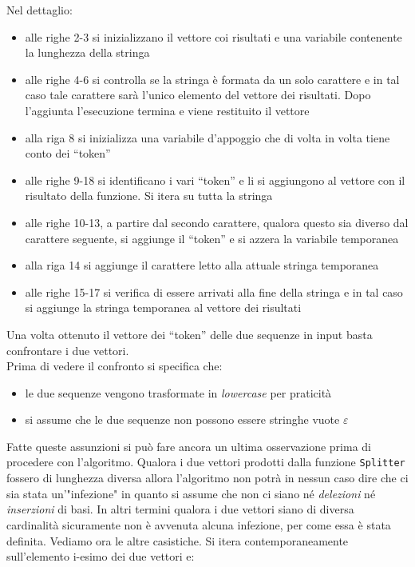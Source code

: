 \documentclass[a4paper,12pt, oneside]{book}
\begin{document}
\noindent
Nel dettaglio:
\begin{itemize}
  \item alle righe 2-3 si inizializzano il vettore coi risultati e una variabile
  contenente la lunghezza della stringa
  \item alle righe 4-6 si controlla se la stringa è formata da un solo
  carattere e in tal caso tale carattere sarà l'unico elemento del vettore dei
  risultati. Dopo l'aggiunta l'esecuzione termina e viene restituito il vettore
  \item alla riga 8 si inizializza una variabile d'appoggio che di volta in
  volta tiene conto dei ``token''
  \item alle righe 9-18 si identificano i vari ``token'' e li si aggiungono al
  vettore con il risultato della funzione. Si itera su tutta la
  stringa 
  \item alle righe 10-13, a partire dal secondo carattere, qualora questo
  sia diverso dal carattere seguente, si aggiunge il ``token'' e si azzera la
  variabile temporanea
  \item alla riga 14 si aggiunge il carattere letto alla attuale
  stringa temporanea
  \item alle righe 15-17 si verifica di essere arrivati alla fine
  della stringa e in tal caso si aggiunge la stringa temporanea al vettore dei
  risultati  
\end{itemize}
Una volta ottenuto il vettore dei ``token'' delle due sequenze in input basta
confrontare i due vettori.\\
Prima di vedere il confronto si specifica che:
\begin{itemize}
  \item le due sequenze vengono trasformate in \textit{lowercase} per praticità
  \item si assume che le due sequenze non possono essere stringhe vuote
  $\varepsilon$ 
\end{itemize}
Fatte queste assunzioni si può fare ancora un ultima osservazione prima di
procedere con l'algoritmo. Qualora i due vettori prodotti dalla funzione
\texttt{Splitter} fossero di lunghezza diversa allora l'algoritmo non potrà in
nessun caso dire che ci sia stata un'"infezione" in quanto si assume che non
ci siano né \textit{delezioni} né \textit{inserzioni} di basi. In altri termini
qualora i 
due vettori siano di diversa cardinalità sicuramente non è
avvenuta alcuna infezione, per come essa è stata definita. Vediamo ora le altre
casistiche. Si itera contemporaneamente sull'elemento i-esimo dei due vettori e: 
\end{document}
